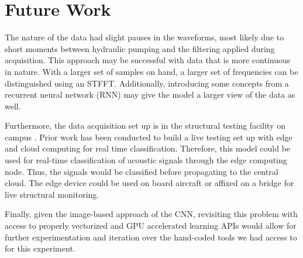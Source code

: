 \documentclass[conference]{IEEEtran}
\begin{document}
\section{Future Work}

The nature of the data had slight pauses in the waveforms, most likely due to short moments between hydraulic pumping and the filtering applied during acquisition. This approach may be successful with data that is more continuous in nature. With a larger set of samples on hand, a larger set of frequencies can be distinguished using an STFFT. Additionally, introducing some concepts from a recurrent neural network (RNN) may give the model a larger view of the data as well.

Furthermore, the data acquisition set up is in the structural testing facility on campus \cite{b10}. Prior work has been conducted to build a live testing set up with edge and cloud computing for real time classification. Therefore, this model could be used for real-time classification of acoustic signals through the edge computing node. Thus, the signals would be classified before propagating to the central cloud. The edge device could be used on board aircraft or affixed on a bridge for live structural monitoring.

Finally, given the image-based approach of the CNN, revisiting this problem with access to properly vectorized and GPU accelerated learning APIs would allow for further experimentation and iteration over the hand-coded tools we had access to for this experiment. 
\end{document}
